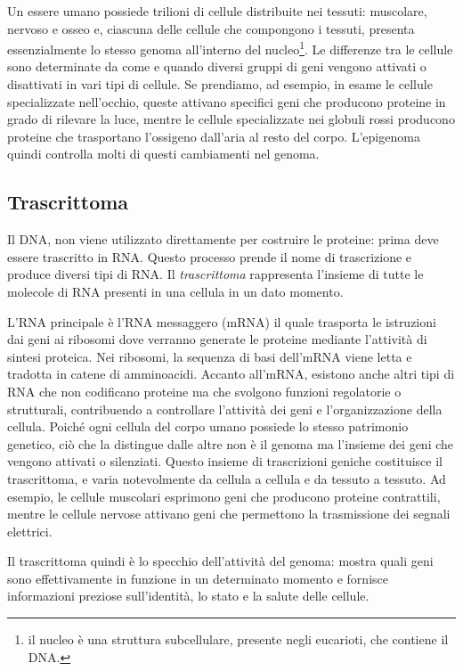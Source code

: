 Un essere umano possiede trilioni
di cellule distribuite nei tessuti: muscolare, nervoso e
osseo e, ciascuna delle cellule che compongono i tessuti,
presenta essenzialmente lo stesso genoma all'interno del
nucleo\footnote{il nucleo è una struttura subcellulare, presente negli
eucarioti, che contiene il DNA.}.
Le differenze tra le cellule sono determinate da come e quando diversi gruppi di geni vengono attivati 
o disattivati in vari tipi di cellule. Se prendiamo, ad esempio, in
esame le cellule specializzate nell'occhio, queste attivano
speciﬁci geni che producono 
proteine in grado di rilevare la luce, mentre le cellule specializzate nei 
globuli rossi producono proteine che trasportano l'ossigeno dall'aria al resto del corpo. 
L'epigenoma quindi controlla molti di questi cambiamenti nel genoma.\cite{genomeGov}

\subsection{Trascrittoma}\label{subsec:trascrittomi}
Il DNA, non viene utilizzato direttamente per costruire le proteine: prima deve essere trascritto in RNA. 
Questo processo prende il nome di trascrizione e produce diversi tipi di RNA.
Il \textit{trascrittoma} rappresenta l'insieme di tutte le molecole di RNA presenti in una cellula in un dato momento.

L'RNA principale è l'RNA messaggero (mRNA) il quale trasporta le istruzioni dai
geni ai ribosomi dove verranno generate le proteine
mediante l'attività di sintesi proteica. Nei ribosomi, 
la sequenza di basi dell'mRNA viene letta e tradotta in catene di amminoacidi.
Accanto all'mRNA, esistono anche altri tipi di RNA che non codificano proteine ma che svolgono funzioni regolatorie 
o strutturali, contribuendo a controllare l'attività dei geni e l'organizzazione della cellula.
Poiché ogni cellula del corpo umano possiede lo stesso patrimonio genetico, 
ciò che la distingue dalle altre non è il genoma ma l'insieme dei geni che vengono attivati o silenziati. 
Questo insieme di trascrizioni geniche costituisce il trascrittoma, e varia notevolmente da cellula a cellula 
e da tessuto a tessuto. Ad esempio, le cellule muscolari esprimono geni che producono proteine contrattili, 
mentre le cellule nervose attivano geni che permettono la trasmissione dei segnali elettrici.

Il trascrittoma quindi è lo specchio dell'attività del genoma: mostra quali geni sono effettivamente 
in funzione in un determinato momento e fornisce informazioni preziose sull'identità, 
lo stato e la salute delle cellule.\cite{genomeGov}

